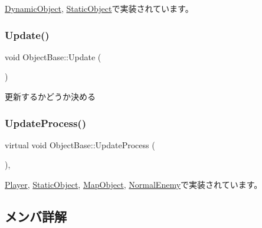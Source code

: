 \mbox{\hyperlink{class_dynamic_object_aa7488e1b4dfd7049447535d93d9d6783}{Dynamic\+Object}}, \mbox{\hyperlink{class_static_object_afec57009537695c4715386120a619942}{Static\+Object}}で実装されています。

\mbox{\label{class_object_base_a5b5672034139b22235ada326eb16dd3e}} 
\subsubsection{\texorpdfstring{Update()}{Update()}}
{\footnotesize\ttfamily void Object\+Base\+::\+Update (\begin{DoxyParamCaption}{ }\end{DoxyParamCaption})}



更新するかどうか決める 

\mbox{\label{class_object_base_a8b5b72b363a419767efde0b0e692ea95}} 
\subsubsection{\texorpdfstring{Update\+Process()}{UpdateProcess()}}
{\footnotesize\ttfamily virtual void Object\+Base\+::\+Update\+Process (\begin{DoxyParamCaption}{ }\end{DoxyParamCaption})\hspace{0.3cm}{\ttfamily [protected]}, {}}



\mbox{\hyperlink{class_player_ab8accc9b83b030f5313f1b4872a7e634}{Player}}, \mbox{\hyperlink{class_static_object_a7fa678c3c4032bb6e9417f93a8bb895c}{Static\+Object}}, \mbox{\hyperlink{class_map_object_ab6b8849f15175417eca94b2703945e4b}{Map\+Object}}, \mbox{\hyperlink{class_normal_enemy_a371a6bef4feaeb0b47e1ab61dead7b77}{Normal\+Enemy}}で実装されています。



\subsection{メンバ詳解}
\mbox{\label{class_object_base_ade1c868f20653a6fa5236544120eca2b}} 
